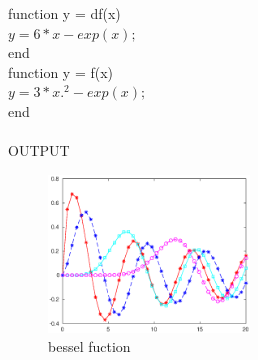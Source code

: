 \documentclass[twoside,a4paper]{article}
\begin{document}
function y = df(x)\\
    $y = 6*x -exp(x);$\\
end\\

function y = f(x)\\
    $y = 3*x.^2 - exp(x);$\\
end\\
\\
\large OUTPUT \\
\begin{figure}[bh]
\centering
\includegraphics[width=2.1in]{Bessel.eps}
\caption{bessel fuction}
\end{figure}
\end{document}
